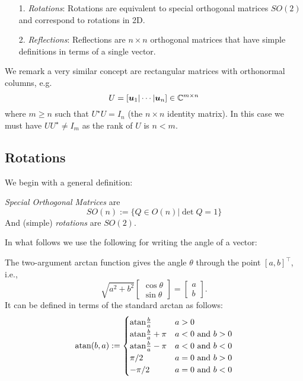 \begin{itemize}
\item[1. ] \emph{Rotations}: Rotations are equivalent to special orthogonal matrices $SO(2)$  and correspond to rotations in 2D.


\item[2. ] \emph{Reflections}:  Reflections are $n \ensuremath{\times} n$ orthogonal matrices that have simple definitions in terms of a single vector.

\end{itemize}
We remark a very similar concept are rectangular matrices with orthonormal columns, e.g.
\[
U = [\bm{{\mbox{\boldmath$u$\unboldmath}}}_1 | \cdots | \bm{{\mbox{\boldmath$u$\unboldmath}}}_n] \in {\mathbb C}^{m \times n}
\]
where $m \ensuremath{\geq} n$ such that $U^\ensuremath{\star} U =  I_n$ (the $n \ensuremath{\times} n$ identity matrix). In this case we must have $UU^\ensuremath{\star} \ensuremath{\neq} I_m$ as the rank of $U$ is $n < m$. 

\subsection{Rotations}
We begin with a general definition:

\begin{definition} \emph{Special Orthogonal Matrices} are
\[
SO(n) := \{Q \ensuremath{\in} O(n) | \det Q = 1 \}
\]
And (simple) \emph{rotations} are $SO(2)$. \end{definition}

In what follows we use the following for writing the angle of a vector:

\begin{definition} The two-argument arctan function gives the angle \texttt{\ensuremath{\theta}} through the point $[a,b]^\ensuremath{\top}$, i.e., 
\[
\sqrt{a^2 + b^2} \begin{bmatrix} \cos \ensuremath{\theta} \\ \sin \ensuremath{\theta} \end{bmatrix} =  \begin{bmatrix} a \\ b \end{bmatrix}.
\]
It can be defined in terms of the standard arctan as follows:
\[
{\rm atan}(b,a) := \begin{cases} {\rm atan}{b \over a} & a > 0 \\
                            {\rm atan}{b \over a} + \ensuremath{\pi} & a < 0\hbox{ and }b >0 \\
                            {\rm atan}{b \over a} - \ensuremath{\pi} & a < 0\hbox{ and }b < 0 \\
                            \ensuremath{\pi}/2 & a = 0\hbox{ and }b >0 \\
                            -\ensuremath{\pi}/2 & a = 0\hbox{ and }b < 0 
                            \end{cases}
\]
\end{definition}

